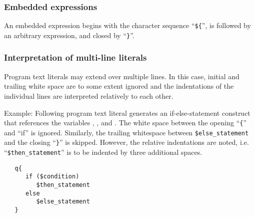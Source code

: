 \subsubsection{Embedded expressions}

An embedded expression begins with the character sequence
``\lstinline!${!'', %
is followed by an arbitrary expression, and closed by
``\lstinline!}!''.

\subsubsection{Interpretation of multi-line literals}

Program text literals may extend over multiple lines. In this
case, initial and trailing white space are to some extent ignored
and the indentations of the individual lines are interpreted
relatively to each other.

Example: Following program text literal generates an
if-else-statement construct that references the variables
, , and .
The white space between the opening ``\lstinline!{!''
and ``if'' is ignored. Similarly, the trailing whitespace between
\lstinline!$else_statement! %
and the closing
``\lstinline!}!''
is skipped.
However, the relative indentations are noted, i.e.
``\lstinline!$then_statement!'' %
is to be indented by three additional spaces.

\begin{lstlisting}
   q{
      if ($condition)
         $then_statement
      else
         $else_statement
   }
\end{lstlisting}

\endinput
